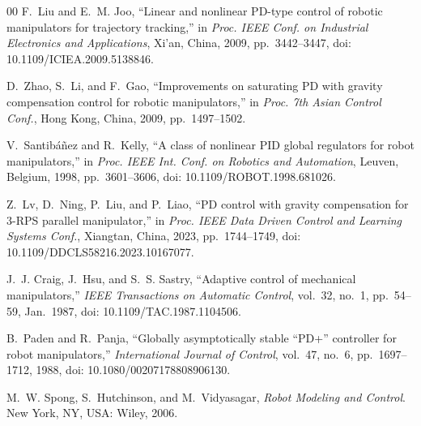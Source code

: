 \documentclass[conference]{IEEEtran}
\begin{document}
\begin{thebibliography}{00}
	F.~Liu and E.~M. Joo,
	``Linear and nonlinear PD-type control of robotic manipulators for trajectory tracking,''
	in \emph{Proc. IEEE Conf. on Industrial Electronics and Applications},
	Xi'an, China, 2009, pp.~3442--3447,
	doi: 10.1109/ICIEA.2009.5138846.
	
	D.~Zhao, S.~Li, and F.~Gao,
	``Improvements on saturating PD with gravity compensation control for robotic manipulators,''
	in \emph{Proc. 7th Asian Control Conf.},
	Hong Kong, China, 2009, pp.~1497--1502.
	
	V.~Santib\'a\~nez and R.~Kelly,
	``A class of nonlinear PID global regulators for robot manipulators,''
	in \emph{Proc. IEEE Int. Conf. on Robotics and Automation},
	Leuven, Belgium, 1998, pp.~3601--3606,
	doi: 10.1109/ROBOT.1998.681026.
	
	Z.~Lv, D.~Ning, P.~Liu, and P.~Liao,
	``PD control with gravity compensation for 3-RPS parallel manipulator,''
	in \emph{Proc. IEEE Data Driven Control and Learning Systems Conf.},
	Xiangtan, China, 2023, pp.~1744--1749,
	doi: 10.1109/DDCLS58216.2023.10167077.
	
	J.~J. Craig, J.~Hsu, and S.~S. Sastry,
	``Adaptive control of mechanical manipulators,''
	\emph{IEEE Transactions on Automatic Control},
	vol.~32, no.~1, pp.~54--59, Jan.~1987,
	doi: 10.1109/TAC.1987.1104506.
	
	B.~Paden and R.~Panja,
	``Globally asymptotically stable ``PD+'' controller for robot manipulators,''
	\emph{International Journal of Control},
	vol.~47, no.~6, pp.~1697--1712, 1988,
	doi: 10.1080/00207178808906130.
	
	M.~W. Spong, S.~Hutchinson, and M.~Vidyasagar,
	\emph{Robot Modeling and Control}.
	New York, NY, USA: Wiley, 2006.
	
\end{thebibliography}
\end{document}
